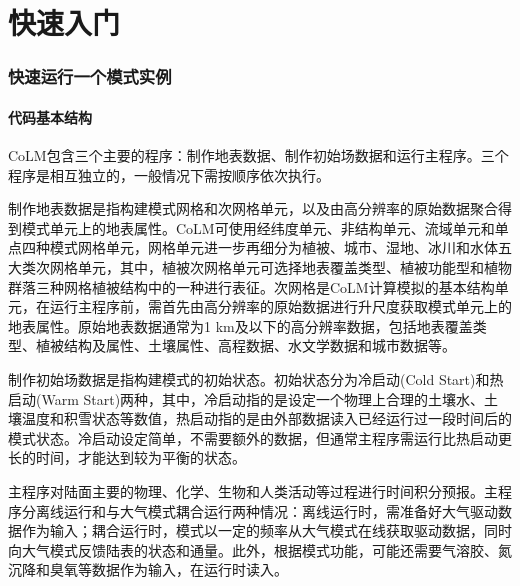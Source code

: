 \part{快速入门}
\section{快速运行一个模式实例}\label{chapter01}

\subsection{代码基本结构}

CoLM包含三个主要的程序：制作地表数据、制作初始场数据和运行主程序。三个程序是相互独立的，一般情况下需按顺序依次执行。

制作地表数据是指构建模式网格和次网格单元，以及由高分辨率的原始数据聚合得到模式单元上的地表属性。CoLM可使用经纬度单元、非结构单元、流域单元和单点四种模式网格单元，网格单元进一步再细分为植被、城市、湿地、冰川和水体五大类次网格单元，其中，植被次网格单元可选择地表覆盖类型、植被功能型和植物群落三种网格植被结构中的一种进行表征。次网格是CoLM计算模拟的基本结构单元，在运行主程序前，需首先由高分辨率的原始数据进行升尺度获取模式单元上的地表属性。原始地表数据通常为1 km及以下的高分辨率数据，包括地表覆盖类型、植被结构及属性、土壤属性、高程数据、水文学数据和城市数据等。

制作初始场数据是指构建模式的初始状态。初始状态分为冷启动(Cold Start)和热启动(Warm Start)两种，其中，冷启动指的是设定一个物理上合理的土壤水、土壤温度和积雪状态等数值，热启动指的是由外部数据读入已经运行过一段时间后的模式状态。冷启动设定简单，不需要额外的数据，但通常主程序需运行比热启动更长的时间，才能达到较为平衡的状态。

主程序对陆面主要的物理、化学、生物和人类活动等过程进行时间积分预报。主程序分离线运行和与大气模式耦合运行两种情况：离线运行时，需准备好大气驱动数据作为输入；耦合运行时，模式以一定的频率从大气模式在线获取驱动数据，同时向大气模式反馈陆表的状态和通量。此外，根据模式功能，可能还需要气溶胶、氮沉降和臭氧等数据作为输入，在运行时读入。

